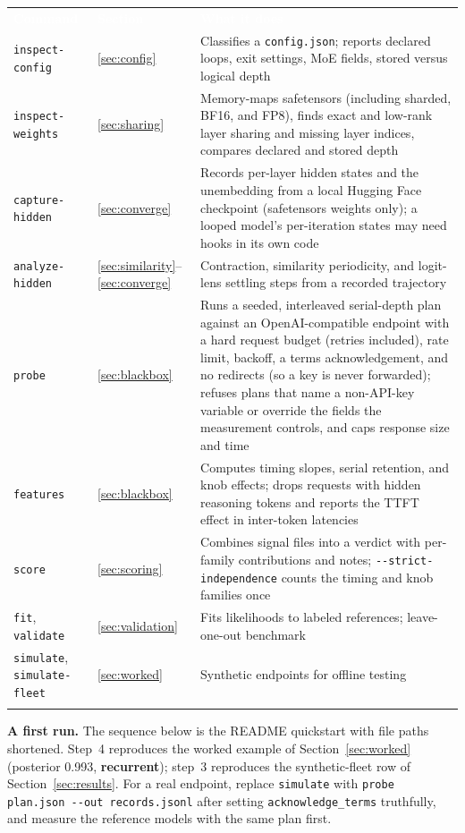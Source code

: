 \documentclass[11pt,letterpaper]{article}
\newcommand{\hd}[1]{\textcolor{white}{\bfseries #1}}
\newcommand{\tablefinish}{\arrayrulecolor{deepindigo}\specialrule{0.8pt}{0pt}{0pt}\arrayrulecolor{black}}
\newcommand{\zebra}{\rowcolors{2}{white}{paleindigo!75}}
\newcommand{\cfg}[1]{\texttt{\small #1}}
\begin{document}
{\footnotesize
\zebra
\begin{tabularx}{\textwidth}{L{3.5cm} L{1.6cm} Y}
\hd{Command} & \hd{Section} & \hd{What it does} \\
\cfg{inspect-config} & \ref{sec:config} & Classifies a \cfg{config.json}; reports declared loops, exit settings, MoE fields, stored versus logical depth \\
\cfg{inspect-weights} & \ref{sec:sharing} & Memory-maps safetensors (including sharded, BF16, and FP8), finds exact and low-rank layer sharing and missing layer indices, compares declared and stored depth \\
\cfg{capture-hidden} & \ref{sec:converge} & Records per-layer hidden states and the unembedding from a local Hugging Face checkpoint (safetensors weights only); a looped model's per-iteration states may need hooks in its own code \\
\cfg{analyze-hidden} & \ref{sec:similarity}--\ref{sec:converge} & Contraction, similarity periodicity, and logit-lens settling steps from a recorded trajectory \\
\cfg{probe} & \ref{sec:blackbox} & Runs a seeded, interleaved serial-depth plan against an OpenAI-compatible endpoint with a hard request budget (retries included), rate limit, backoff, a terms acknowledgement, and no redirects (so a key is never forwarded); refuses plans that name a non-API-key variable or override the fields the measurement controls, and caps response size and time \\
\cfg{features} & \ref{sec:blackbox} & Computes timing slopes, serial retention, and knob effects; drops requests with hidden reasoning tokens and reports the TTFT effect in inter-token latencies \\
\cfg{score} & \ref{sec:scoring} & Combines signal files into a verdict with per-family contributions and notes; \cfg{-{}-strict-independence} counts the timing and knob families once \\
\cfg{fit}, \cfg{validate} & \ref{sec:validation} & Fits likelihoods to labeled references; leave-one-out benchmark \\
\cfg{simulate}, \cfg{simulate-fleet} & \ref{sec:worked} & Synthetic endpoints for offline testing \\
\tablefinish
\end{tabularx}\par}

\textbf{A first run.} The sequence below is the README quickstart with file paths shortened. Step~4 reproduces the worked example of Section~\ref{sec:worked} (posterior 0.993, \textbf{recurrent}); step~3 reproduces the synthetic-fleet row of Section~\ref{sec:results}. For a real endpoint, replace \cfg{simulate} with \cfg{probe plan.json -{}-out records.jsonl} after setting \cfg{acknowledge\_terms} truthfully, and measure the reference models with the same plan first.
\end{document}

